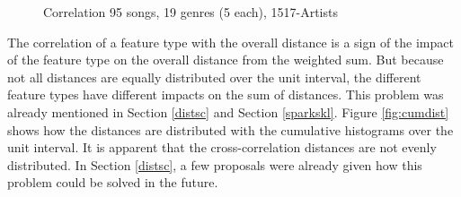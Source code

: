 \begin{figure}[htbp]
	\centering
	\caption{Correlation 95 songs, 19 genres (5 each), 1517-Artists}
	\label{fig:corr2}
\end{figure}\FloatBarrier

\noindent The correlation of a feature type with the overall distance is a sign of the impact of the feature type on the overall distance from the weighted sum. But because not all distances are equally distributed over the unit interval, the different feature types have different impacts on the sum of distances. This problem was already mentioned in Section \ref{distsc} and Section \ref{sparkskl}. Figure \ref{fig:cumdist} shows how the distances are distributed with the cumulative histograms over the unit interval. It is apparent that the cross-correlation distances are not evenly distributed. In Section \ref{distsc}, a few proposals were already given how this problem could be solved in the future. 

